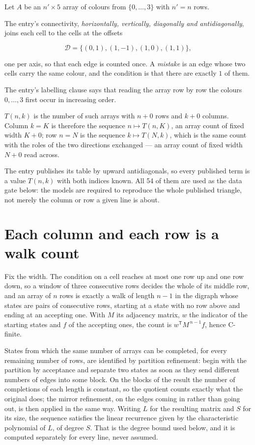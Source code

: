 \documentclass[11pt]{article}
\theoremstyle{definition}
\begin{document}
Let $A$ be an $n' \times 5$ array of colours from $\{0,\dots,3\}$ with $n' = n$ rows.

The entry's connectivity, {\itshape horizontally, vertically, diagonally and antidiagonally}, joins each cell to the cells at the offsets

\[\mathcal{D} = \{(0,1), (1,-1), (1,0), (1,1)\},\]

one per axis, so that each edge is counted once. A {\itshape mistake} is an edge whose two cells carry the same colour, and the condition is that there are exactly $1$ of them.

The entry's labelling clause says that reading the array row by row the colours $0,\dots,3$ first occur in increasing order.

$T(n,k)$ is the number of such arrays with $n + 0$ rows and $k + 0$ columns. Column $k = K$ is therefore the sequence $n \mapsto T(n,K)$, an array count of fixed width $K + 0$; row $n = N$ is the sequence $k \mapsto T(N,k)$, which is the same count with the roles of the two directions exchanged --- an array count of fixed width $N + 0$ read across.

The entry publishes its table by upward antidiagonals, so every published term is a value $T(n,k)$ with both indices known. All 54 of them are used as the data gate below: the models are required to reproduce the whole published triangle, not merely the column or row a given line is about.

\section{Each column and each row is a walk count}

Fix the width. The condition on a cell reaches at most one row up and one row down, so a window of three consecutive rows decides the whole of its middle row, and an array of $n$ rows is exactly a walk of length $n-1$ in the digraph whose states are pairs of consecutive rows, starting at a state with no row above and ending at an accepting one. With $M$ its adjacency matrix, $w$ the indicator of the starting states and $f$ of the accepting ones, the count is $w^{\mathsf T}M^{\,n-1}f$, hence C-finite.

States from which the same number of arrays can be completed, for every remaining number of rows, are identified by partition refinement: begin with the partition by acceptance and separate two states as soon as they send different numbers of edges into some block. On the blocks of the result the number of completions of each length is constant, so the quotient counts exactly what the original does; the mirror refinement, on the edges coming in rather than going out, is then applied in the same way. Writing $L$ for the resulting matrix and $S$ for its size, the sequence satisfies the linear recurrence given by the characteristic polynomial of $L$, of degree $S$. That is the degree bound used below, and it is computed separately for every line, never assumed.
\end{document}
